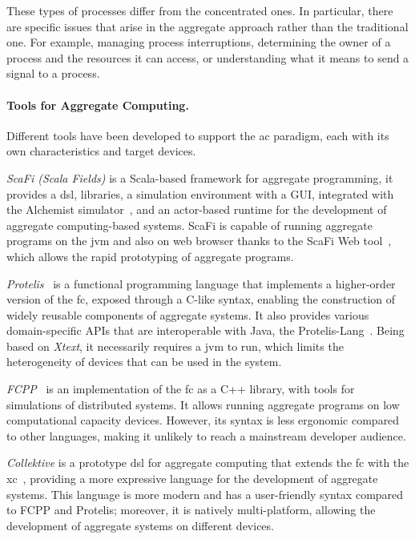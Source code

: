\documentclass[12pt, a4paper]{article}
\begin{document}
These types of processes differ from the concentrated ones.
%
In particular, there are specific issues that arise in the aggregate approach rather than the traditional one.
%
For example, managing process interruptions, determining the owner of a process and the resources it can access,
or understanding what it means to send a signal to a process.


\sloppypar
\paragraph{Tools for Aggregate Computing.}

Different tools have been developed to support the \ac{ac} paradigm,
each with its own characteristics and target devices.

\emph{ScaFi (Scala Fields)}\cite{scafi} is a Scala-based framework for aggregate programming,
it provides a \ac{dsl}, libraries, a simulation environment with a GUI,
integrated with the Alchemist simulator~\cite{PianiniJOS2013},
and an actor-based runtime for the development of aggregate computing-based systems.
%
ScaFi is capable of running aggregate programs on the \ac{jvm} and also on web browser thanks to the ScaFi Web tool~\cite{Coordination2021-scafiweb},
which allows the rapid prototyping of aggregate programs.

\emph{Protelis}~\cite{PianiniSAC2015} is a functional programming language that implements a higher-order version of the \ac{fc},
exposed through a C-like syntax,
enabling the construction of widely reusable components of aggregate systems.
%
It also provides various domain-specific APIs that are interoperable with Java, the Protelis-Lang~\cite{SASO2017-protelislang}.
%
Being based on \emph{Xtext},
it necessarily requires a \ac{jvm} to run,
which limits the heterogeneity of devices that can be used in the system.

\emph{FCPP}~\cite{DBLP:journals/scp/AudritoT24} is an implementation of the \ac{fc} as a C++ library,
with tools for simulations of distributed systems.
%
It allows running aggregate programs on low computational capacity devices.
%
However,
its syntax is less ergonomic compared to other languages,
making it unlikely to reach a mainstream developer audience.

\emph{Collektive} is a prototype \ac{dsl} for aggregate computing that extends the \ac{fc} with the \ac{xc}~\cite{AudritoCDSV24},
providing a more expressive language for the development of aggregate systems.
%
This language is more modern and has a user-friendly syntax compared to FCPP and Protelis;
moreover, it is natively multi-platform,
allowing the development of aggregate systems on different devices.
\end{document}
